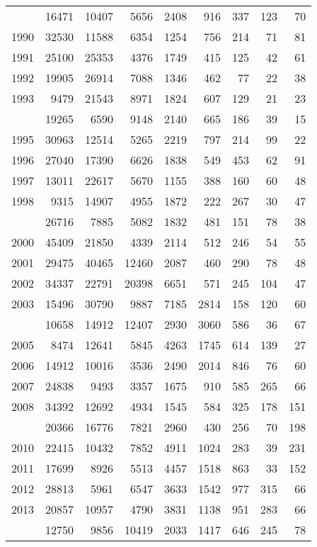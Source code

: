 \documentclass[
]{article}
\begin{document}
\begin{longtable}[t]{lrrrrrrrr}
\endfoot
\bottomrule
\endlastfoot
1989 & 16471 & 10407 & 5656 & 2408 & 916 & 337 & 123 & 70\\
1990 & 32530 & 11588 & 6354 & 1254 & 756 & 214 & 71 & 81\\
1991 & 25100 & 25353 & 4376 & 1749 & 415 & 125 & 42 & 61\\
1992 & 19905 & 26914 & 7088 & 1346 & 462 & 77 & 22 & 38\\
1993 & 9479 & 21543 & 8971 & 1824 & 607 & 129 & 21 & 23\\
\addlinespace
1994 & 19265 & 6590 & 9148 & 2140 & 665 & 186 & 39 & 15\\
1995 & 30963 & 12514 & 5265 & 2219 & 797 & 214 & 99 & 22\\
1996 & 27040 & 17390 & 6626 & 1838 & 549 & 453 & 62 & 91\\
1997 & 13011 & 22617 & 5670 & 1155 & 388 & 160 & 60 & 48\\
1998 & 9315 & 14907 & 4955 & 1872 & 222 & 267 & 30 & 47\\
\addlinespace
1999 & 26716 & 7885 & 5082 & 1832 & 481 & 151 & 78 & 38\\
2000 & 45409 & 21850 & 4339 & 2114 & 512 & 246 & 54 & 55\\
2001 & 29475 & 40465 & 12460 & 2087 & 460 & 290 & 78 & 48\\
2002 & 34337 & 22791 & 20398 & 6651 & 571 & 245 & 104 & 47\\
2003 & 15496 & 30790 & 9887 & 7185 & 2814 & 158 & 120 & 60\\
\addlinespace
2004 & 10658 & 14912 & 12407 & 2930 & 3060 & 586 & 36 & 67\\
2005 & 8474 & 12641 & 5845 & 4263 & 1745 & 614 & 139 & 27\\
2006 & 14912 & 10016 & 3536 & 2490 & 2014 & 846 & 76 & 60\\
2007 & 24838 & 9493 & 3357 & 1675 & 910 & 585 & 265 & 66\\
2008 & 34392 & 12692 & 4934 & 1545 & 584 & 325 & 178 & 151\\
\addlinespace
2009 & 20366 & 16776 & 7821 & 2960 & 430 & 256 & 70 & 198\\
2010 & 22415 & 10432 & 7852 & 4911 & 1024 & 283 & 39 & 231\\
2011 & 17699 & 8926 & 5513 & 4457 & 1518 & 863 & 33 & 152\\
2012 & 28813 & 5961 & 6547 & 3633 & 1542 & 977 & 315 & 66\\
2013 & 20857 & 10957 & 4790 & 3831 & 1138 & 951 & 283 & 66\\
\addlinespace
2014 & 12750 & 9856 & 10419 & 2033 & 1417 & 646 & 245 & 78\\

\end{longtable}
\end{document}

